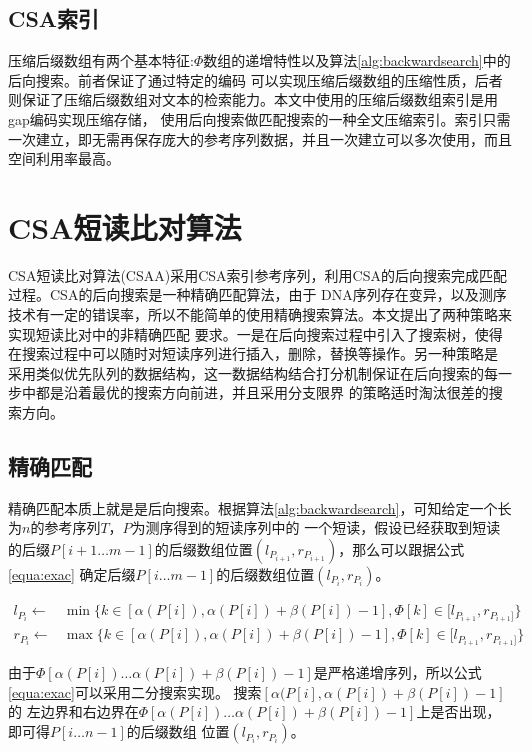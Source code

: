 \documentclass[UTF8,adobefonts]{ctexart}
\begin{document}
\subsection{CSA索引}

压缩后缀数组有两个基本特征:$\Phi$数组的递增特性以及算法\ref{alg:backwardsearch}中的后向搜索。前者保证了通过特定的编码
可以实现压缩后缀数组的压缩性质，后者则保证了压缩后缀数组对文本的检索能力。本文中使用的压缩后缀数组索引是用gap编码实现压缩存储，
使用后向搜索做匹配搜索的一种全文压缩索引。索引只需一次建立，即无需再保存庞大的参考序列数据，并且一次建立可以多次使用，而且
空间利用率最高。

\section{CSA短读比对算法}

CSA短读比对算法(CSAA)采用CSA索引参考序列，利用CSA的后向搜索完成匹配过程。CSA的后向搜索是一种精确匹配算法，由于
DNA序列存在变异，以及测序技术有一定的错误率，所以不能简单的使用精确搜索算法。本文提出了两种策略来实现短读比对中的非精确匹配
要求。一是在后向搜索过程中引入了搜索树，使得在搜索过程中可以随时对短读序列进行插入，删除，替换等操作。另一种策略是
采用类似优先队列的数据结构，这一数据结构结合打分机制保证在后向搜索的每一步中都是沿着最优的搜索方向前进，并且采用分支限界
的策略适时淘汰很差的搜索方向。

\subsection{精确匹配}
精确匹配本质上就是是后向搜索。根据算法\ref{alg:backwardsearch}，可知给定一个长为$n$的参考序列$T$，$P$为测序得到的短读序列中的
一个短读，假设已经获取到短读的后缀$P[i+1\ldots m-1]$的后缀数组位置$(l_{P_{i+1}},r_{P_{i+1}})$，那么可以跟据公式\ref{equa:exac}
确定后缀$P[i\ldots m-1]$的后缀数组位置$(l_{P_i},r_{P_i})$。

\begin{equation}\label{equa:exac}
    \begin{split}
        l_{P_i} \gets &\min\{ k \in [\alpha(P[i]),\alpha(P[i])+\beta(P[i])-1],\Phi[k] \in [l_{P_{i+1}},r_{P_{i+1}]}\}\\
        r_{P_i} \gets &\max\{ k \in [\alpha(P[i]),\alpha(P[i])+\beta(P[i])-1],\Phi[k] \in [l_{P_{i+1}},r_{P_{i+1}]}\}
    \end{split}
\end{equation}

由于$\Phi[\alpha(P[i])\ldots \alpha(P[i])+\beta(P[i])-1]$是严格递增序列，所以公式\ref{equa:exac}可以采用二分搜索实现。
搜索$[\alpha(P[i],\alpha(P[i])+\beta(P[i])-1]$的
左边界和右边界在$\Phi[\alpha(P[i])\ldots \alpha(P[i])+\beta(P[i])-1]$上是否出现，即可得$P[i\ldots n-1]$的后缀数组
位置$(l_{P_i},r_{P_i})$。
\end{document}
